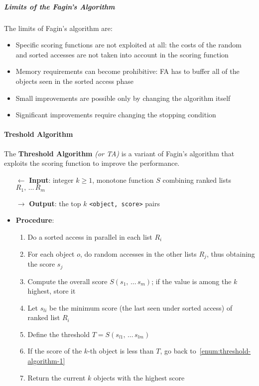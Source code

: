 \documentclass[english]{article}
\begin{document}
\subparagraph*{Limits of the Fagin's Algorithm}
The limits of Fagin's algorithm are:

\begin{itemize}
  \item Specific scoring functions are not exploited at all: the costs of the random and sorted accesses are not taken into account in the scoring function
  \item Memory requirements can become prohibitive: FA has to buffer all of the objects seen in the sorted access phase
  \item Small improvements are possible only by changing the algorithm itself
  \item Significant improvements require changing the stopping condition
\end{itemize}

\paragraph{Treshold Algorithm}

The \textbf{Threshold Algorithm} \textit{(or TA)} is a variant of Fagin's algorithm that exploits the scoring function to improve the performance.

\begin{itemize}
  \item[\(\leftarrow\)] \textbf{Input}: integer \(k \geq 1\), monotone function \(S\) combining ranked lists \(R_1, \,\ldots\, R_m\)
  \item[\(\rightarrow\)] \textbf{Output}: the top \(k\) \texttt{<object, score>} pairs
  \item \textbf{Procedure}:
        \begin{enumerate}[label=step \arabic*., ref=step (\arabic*), widest*=7, leftmargin=*, labelindent=1em]
          \item\label{enum:threshold-algorithm-1} Do a sorted access in parallel in each list \(R_i\)
          \item For each object \(o\), do random accesses in the other lists \(R_j\), thus obtaining the score \(s_j\)
          \item Compute the overall score \(S\left( s_1, \,\ldots\, s_m \right)\); if the value is among the \(k\) highest, store it
          \item Let \(s_{li}\) be the minimum score (the last seen under sorted access) of ranked list \(R_i\)
          \item Define the threshold \(T = S\left( s_{l1}, \,\ldots\, s_{lm} \right)\)
          \item If the score of the \(k\)-th object is less than \(T\), go back to~\ref{enum:threshold-algorithm-1}
          \item Return the current \(k\) objects with the highest score
        \end{enumerate}
\end{itemize}
\end{document}
